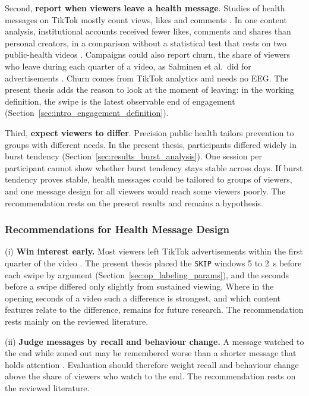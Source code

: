 \documentclass[12pt,a4paper]{report}
\begin{document}
Second, \textbf{report when viewers leave a health message}. Studies of health messages on TikTok mostly count views, likes and comments \cite{mccashin_using_2023, chen_factors_2021}. In one content analysis, institutional accounts received fewer likes, comments and shares than personal creators, in a comparison without a statistical test that rests on two public-health videos \cite{mccashin_using_2023}. Campaigns could also report churn, the share of viewers who leave during each quarter of a video, as Salminen et al.\ did for advertisements \cite{salminen_engagement_2024}. Churn comes from TikTok analytics and needs no EEG. The present thesis adds the reason to look at the moment of leaving: in the working definition, the swipe is the latest observable end of engagement (Section~\ref{sec:intro_engagement_definition}).

Third, \textbf{expect viewers to differ}. Precision public health tailors prevention to groups with different needs. In the present thesis, participants differed widely in burst tendency (Section~\ref{sec:results_burst_analysis}). One session per participant cannot show whether burst tendency stays stable across days. If burst tendency proves stable, health messages could be tailored to groups of viewers, and one message design for all viewers would reach some viewers poorly. The recommendation rests on the present results and remains a hypothesis.

\subsubsection{Recommendations for Health Message Design}

(i) \textbf{Win interest early.} Most viewers left TikTok advertisements within the first quarter of the video \cite{salminen_engagement_2024}. The present thesis placed the \texttt{SKIP} windows 5 to 2~s before each swipe by argument (Section~\ref{sec:op_labeling_params}), and the seconds before a swipe differed only slightly from sustained viewing. Where in the opening seconds of a video such a difference is strongest, and which content features relate to the difference, remains for future research. The recommendation rests mainly on the reviewed literature.

(ii) \textbf{Judge messages by recall and behaviour change.} A message watched to the end while zoned out may be remembered worse than a shorter message that holds attention \cite{baughan_i_2022, debettencourt_sustained_2021}. Evaluation should therefore weight recall and behaviour change above the share of viewers who watch to the end. The recommendation rests on the reviewed literature.
\end{document}
